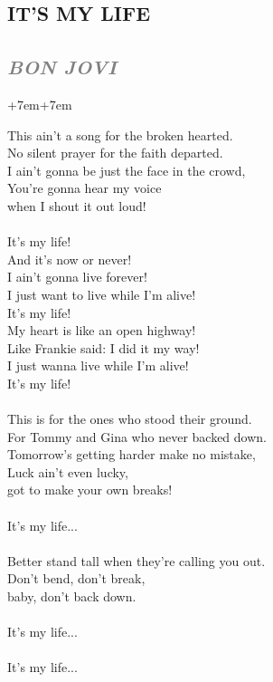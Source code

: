 \documentclass[100pt,a4paper]{report}
\newenvironment{song1}[3]
	{
			\begin{spacing}{0.6}
				\section*{\LARGE\centering \MakeUppercase{\textbf{{#1}}}}
				\subsection*{\Large\centering \textit{\textcolor{gray}{\MakeUppercase{{#2}}}}}
			\end{spacing}
			\vspace{0.8cm}
			\begin{adjustwidth}{+7em}{+7em}
			\Large
			
	}
	{
		\end{adjustwidth}
		\newpage
    }
\begin{document}
\begin{song1}{it's my life}{bon jovi}
\noindent
This ain't a song for the broken hearted.\\
No silent prayer for the faith departed.\\
I ain't gonna be just the face in the crowd,\\
You're gonna hear my voice\\
when I shout it out loud!\\
\\
It's my life!\\
And it's now or never!\\
I ain't gonna live forever!\\
I just want to live while I'm alive!\\
It's my life!\\
My heart is like an open highway!\\
Like Frankie said: I did it my way!\\
I just wanna live while I'm alive!\\
It's my life!\\
\\
This is for the ones who stood their ground.\\
For Tommy and Gina who never backed down.\\
Tomorrow's getting harder make no mistake,\\
Luck ain't even lucky,\\
got to make your own breaks!\\
\\
It's my life...\\
\\
Better stand tall when they're calling you out.\\
Don't bend, don't break,\\
baby, don't back down.\\
\\
It's my life...\\
\\
It's my life...
\end{song1}
\end{document}
